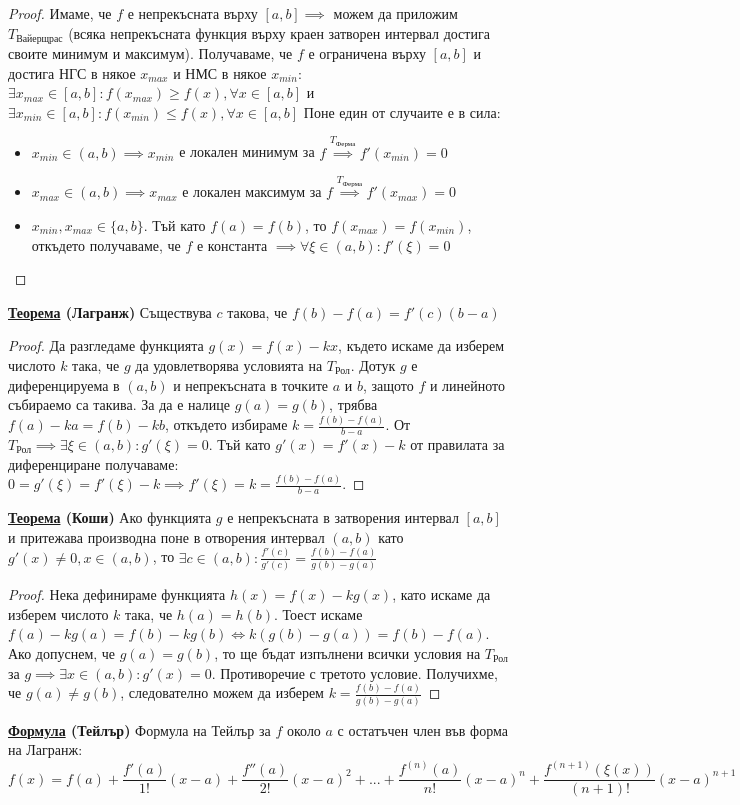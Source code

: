 \documentclass{article}
\begin{document}
\begin{proof}
Имаме, че $f$ е непрекъсната върху $[a, b] \implies $ можем да приложим $T_{\text{Вайерщрас}}$ (всяка непрекъсната функция върху
краен затворен интервал достига своите минимум и максимум). Получаваме, че
$f$ е ограничена върху $[a, b]$ и достига НГС в някое $x_{max}$ и НМС в някое $x_{min}$: $\exists x_{max} \in [a, b] : f(x_{max})
\ge f(x), \forall x \in [a, b]$ и $\exists x_{min} \in [a, b] : f(x_{min}) \le f(x), \forall x \in [a, b]$
Поне един от случаите е в сила:
\begin{itemize}
    \item $x_{min} \in (a, b) \implies x_{min}$ е локален минимум за $f \overset{T_{\text{Ферма}}}{\implies} f'(x_{min}) = 0$
    \item $x_{max} \in (a, b) \implies x_{max}$ е локален максимум за $f \overset{T_{\text{Ферма}}}{\implies} f'(x_{max}) = 0$
    \item $x_{min}, x_{max} \in \{a, b\}$. Тъй като $f(a) = f(b)$, то $f(x_{max}) = f(x_{min})$, откъдето получаваме, че $f$ е
    константа $\implies \forall \xi \in (a, b) : f'(\xi) = 0$
\end{itemize}
\end{proof}
\textbf{\underline{Теорема} (Лагранж)} \newline
Съществува $c$ такова, че $f(b) - f(a) = f'(c)(b - a)$
\begin{proof}
Да разгледаме функцията $g(x) = f(x) - kx$, където искаме да изберем числото $k$ така, че $g$ да удовлетворява условията на
$T_{\text{Рол}}$. Дотук $g$ е диференцируема в $(a, b)$ и непрекъсната в точките $a$ и $b$, защото $f$ и линейното събираемо
са такива. За да е налице $g(a) = g(b)$, трябва $f(a) - ka = f(b) - kb$, откъдето избираме $k = \frac{f(b) - f(a)}{b - a}$.
От $T_{\text{Рол}} \implies \exists \xi \in (a, b) : g'(\xi) = 0$. Тъй като $g'(x) = f'(x) - k$ от правилата за диференциране
получаваме: $0 = g'(\xi) = f'(\xi) - k \implies f'(\xi) = k = \frac{f(b) - f(a)}{b - a}$.
\end{proof}
\textbf{\underline{Теорема} (Коши)} \newline
Ако функцията $g$ е непрекъсната в затворения интервал $[a, b]$ и притежава производна поне в отворения интервал $(a, b)$
като $g'(x) \neq 0, x \in (a, b)$, то $\exists c \in (a, b) : \frac{f'(c)}{g'(c)} = \frac{f(b) - f(a)}{g(b) - g(a)}$
\begin{proof}
Нека дефинираме функцията $h(x) = f(x) - kg(x)$, като искаме да изберем числото $k$ така, че $h(a) = h(b)$.
Тоест искаме $f(a) - kg(a) = f(b) - kg(b) \iff k(g(b) - g(a)) = f(b) - f(a)$. Ако допуснем, че $g(a) = g(b)$, то ще бъдат
изпълнени всички условия на $T_{\text{Рол}}$ за $g \implies \exists x \in (a, b) : g'(x) = 0$. Противоречие с третото условие.
Получихме, че $g(a) \neq g(b)$, следователно можем да изберем $k = \frac{f(b) - f(a)}{g(b) - g(a)}$ \newline
\end{proof}
\textbf{\underline{Формула} (Тейлър)} \newline
Формула на Тейлър за $f$ около $a$ с остатъчен член във форма на Лагранж:
$$f(x) = f(a) + \frac{f'(a)}{1!}(x - a) + \frac{f''(a)}{2!}(x - a)^2 + ... + \frac{f^{(n)}(a)}{n!}(x - a)^n + \frac{f^{(n + 1)}
(\xi(x))}{(n + 1)!}(x - a)^{n + 1}$$
\end{document}
